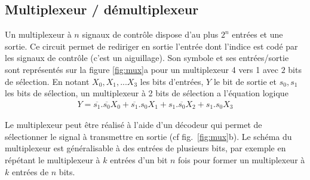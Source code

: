 \subsection{Multiplexeur / démultiplexeur}

Un multiplexeur à $n$ signaux de contrôle dispose d'au plus $2^n$ entrées et une sortie. Ce circuit permet de rediriger en sortie l'entrée dont l'indice est codé par les signaux de contrôle (c'est un aiguillage). Son symbole et ses entrées/sortie sont représentés sur la figure \ref{fig:mux}a pour un multiplexeur 4 vers 1 avec $2$ bits de sélection. En notant $X_0, X_1, ... X_{3}$ les bits d'entrées, $Y$ le bit de sortie et $s_0, s_1$ les bits de sélection, un multiplexeur à 2 bits de sélection a l'équation logique 
\begin{eqnarray*}
Y = \overline{s_1}.\overline{s_0}X_0 + \overline{s_1}.s_0 X_1 + s_1.\overline{s_0}X_2 + s_1.s_0 X_3
\end{eqnarray*}

Le multiplexeur peut être réalisé à l'aide d'un décodeur qui permet de sélectionner le signal à transmettre en sortie (cf fig.~\ref{fig:mux}b). Le schéma du multiplexeur est généralisable à des entrées de plusieurs bits, par exemple en répétant le multiplexeur à $k$ entrées d'un bit $n$ fois pour former un multiplexeur à $k$ entrées de $n$ bits.

